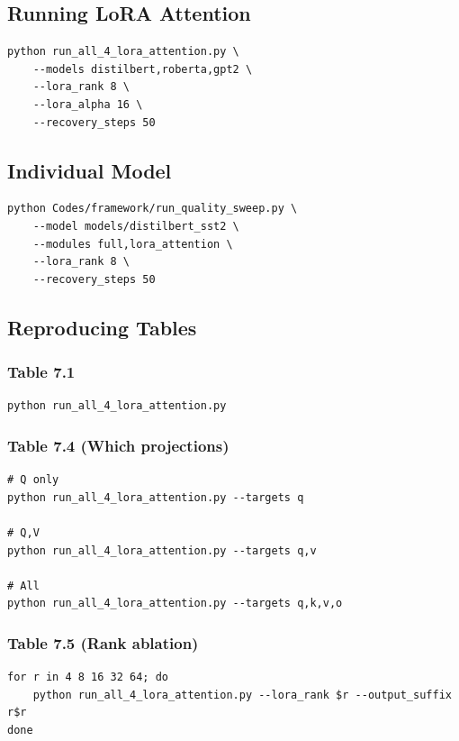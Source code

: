 \subsection{Running LoRA Attention}

\begin{lstlisting}
python run_all_4_lora_attention.py \
    --models distilbert,roberta,gpt2 \
    --lora_rank 8 \
    --lora_alpha 16 \
    --recovery_steps 50
\end{lstlisting}

\subsection{Individual Model}

\begin{lstlisting}
python Codes/framework/run_quality_sweep.py \
    --model models/distilbert_sst2 \
    --modules full,lora_attention \
    --lora_rank 8 \
    --recovery_steps 50
\end{lstlisting}

\subsection{Reproducing Tables}

\subsubsection{Table 7.1}
\begin{lstlisting}
python run_all_4_lora_attention.py
\end{lstlisting}

\subsubsection{Table 7.4 (Which projections)}
\begin{lstlisting}
# Q only
python run_all_4_lora_attention.py --targets q

# Q,V
python run_all_4_lora_attention.py --targets q,v

# All
python run_all_4_lora_attention.py --targets q,k,v,o
\end{lstlisting}

\subsubsection{Table 7.5 (Rank ablation)}
\begin{lstlisting}
for r in 4 8 16 32 64; do
    python run_all_4_lora_attention.py --lora_rank $r --output_suffix r$r
done
\end{lstlisting}

